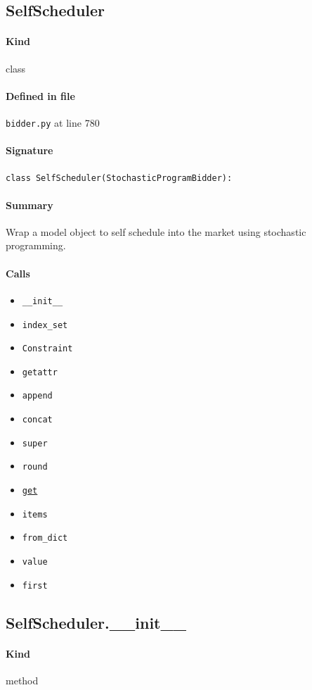 \documentclass[11pt]{report}
\begin{document}
\subsection{SelfScheduler}
\label{def:bidder.py:SelfScheduler:L780}
\paragraph{Kind} class
\paragraph{Defined in file} \texttt{bidder.py} at line 780
\paragraph{Signature} \texttt{class SelfScheduler(StochasticProgramBidder):}
\paragraph{Summary} Wrap a model object to self schedule into the market using stochastic programming.
\paragraph{Calls}
\begin{itemize}[leftmargin=*]
  \item \texttt{\_\_init\_\_}
  \item \texttt{index\_set}
  \item \texttt{Constraint}
  \item \texttt{getattr}
  \item \texttt{append}
  \item \texttt{concat}
  \item \texttt{super}
  \item \texttt{round}
  \item \hyperref[def:tests-test_backcaster.py:DAPrices.get:L294]{\texttt{get}}
  \item \texttt{items}
  \item \texttt{from\_dict}
  \item \texttt{value}
  \item \texttt{first}
\end{itemize}
\subsection{SelfScheduler.\_\_init\_\_}
\label{def:bidder.py:SelfScheduler.__init__:L785}
\paragraph{Kind} method
\end{document}
